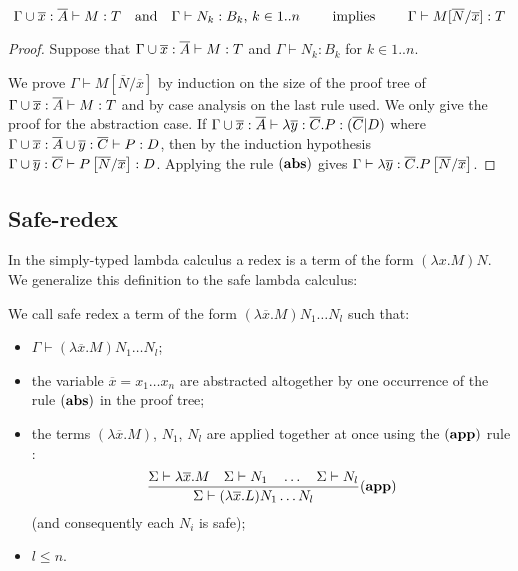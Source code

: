 \begin{lem}
\label{lem:subst_preserve_i}
$$ \Gamma\cup \overline{x} : \overline{A}\vdash M : T
\quad \mbox{and} \quad \Gamma \vdash N_k : B_k \mbox{, } k \in
1..n \qquad \mbox{ implies } \qquad \Gamma \vdash
M[\overline{N}/\overline{x}] : T$$
\end{lem}

\begin{proof}
Suppose that $\Gamma \cup \overline{x}: \overline{A} \vdash M :T$ and
$\Gamma \vdash N_k : B_k$ for $k \in 1..n$.

We prove $\Gamma \vdash M[\overline{N}/\overline{x}]$ by induction
on the size of the proof tree of $\Gamma\cup
\overline{x}:\overline{A} \vdash M : T$ and by case analysis on the
last rule used. We only give the proof for the abstraction case. If
$\Gamma \cup \overline{x}:\overline{A} \vdash \lambda \overline{y}
: \overline{C}. P : (\overline{C}|D)$ where $\Gamma\cup
\overline{x}:\overline{A}\cup \overline{y}:\overline{C} \vdash P :
D$, then by the induction hypothesis $\Gamma\cup
\overline{y}:\overline{C} \vdash P\left[ \overline{N}/\overline{x} \right]
: D$. Applying the rule $\mathbf{(abs)}$ gives $\Gamma \vdash
\lambda \overline{y}:\overline{C} . P
\left[ \overline{N}/\overline{x} \right]$.
\end{proof}

\subsection{Safe-redex}
In the simply-typed lambda calculus a redex is a term of the form
$(\lambda x . M) N$. We generalize this definition to the safe
lambda calculus:
\begin{dfn}
We call safe redex a term of the form $(\lambda \overline{x} . M)
N_1 \ldots N_l$ such that:
\begin{itemize}
\item $ \Gamma \vdash (\lambda \overline{x} . M) N_1 \ldots N_l $;
\item the variable $\overline{x}=x_1\ldots x_n$ are abstracted altogether by one occurrence of the rule $\mathbf{(abs)}$ in the proof
tree;
\item the terms $(\lambda \overline{x} . M)$, $N_1$, $N_l$ are applied together at once using the $\mathbf{(app)}$ rule :
$$   \frac{\displaystyle 
            \Sigma \vdash \lambda \overline{x} . M
            \quad
            \Sigma \vdash N_1         \quad \ldots \quad \Sigma \vdash N_l
    }{
       \Sigma \vdash (\lambda \overline{x} . L) N_1 \ldots N_l
    } (\mathbf{app})
$$
(and consequently each $N_i$ is safe);

\item $l\leq n$.
\end{itemize}
\end{dfn}

